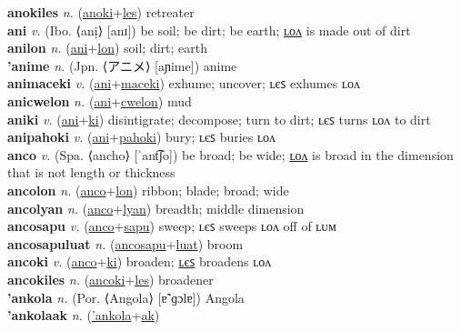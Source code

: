 \textbf{anokiles} \textit{n.} (\hyperref[anoki]{anoki}+\hyperref[les]{les})
retreater \label{anokiles} \\
\textbf{ani} \textit{v.} (Ibo. ⟨anị⟩ [anɪ])
be soil; be dirt; be earth; \hyperref[anilon]{ʟᴏᴧ} is made out of dirt \label{ani} \\
\textbf{anilon} \textit{n.} (\hyperref[ani]{ani}+\hyperref[lon]{lon})
soil; dirt; earth \label{anilon} \\
\textbf{'anime} \textit{n.} (Jpn. ⟨アニメ⟩ [aɲime])
anime \label{'anime} \\
\textbf{animaceki} \textit{v.} (\hyperref[ani]{ani}+\hyperref[maceki]{maceki})
exhume; uncover; ʟєꜱ exhumes ʟᴏᴧ \label{animaceki} \\
\textbf{anicwelon} \textit{n.} (\hyperref[ani]{ani}+\hyperref[cwelon]{cwelon})
mud \label{anicwelon} \\
\textbf{aniki} \textit{v.} (\hyperref[ani]{ani}+\hyperref[ki]{ki})
disintigrate; decompose; turn to dirt; ʟєꜱ turns ʟᴏᴧ to dirt \label{aniki} \\
\textbf{anipahoki} \textit{v.} (\hyperref[ani]{ani}+\hyperref[pahoki]{pahoki})
bury; ʟєꜱ buries ʟᴏᴧ \label{anipahoki} \\
\textbf{anco} \textit{v.} (Spa. ⟨ancho⟩ [ˈant͡ʃo])
be broad; be wide; \hyperref[ancolon]{ʟᴏᴧ} is broad in the dimension that is not length or thickness \label{anco} \\
\textbf{ancolon} \textit{n.} (\hyperref[anco]{anco}+\hyperref[lon]{lon})
ribbon; blade; broad; wide \label{ancolon} \\
\textbf{ancolyan} \textit{n.} (\hyperref[anco]{anco}+\hyperref[lyan]{lyan})
breadth; middle dimension \label{ancolyan} \\
\textbf{ancosapu} \textit{v.} (\hyperref[anco]{anco}+\hyperref[sapu]{sapu})
sweep; ʟєꜱ sweeps ʟᴏᴧ off of ʟᴜᴍ \label{ancosapu} \\
\textbf{ancosapuluat} \textit{n.} (\hyperref[ancosapu]{ancosapu}+\hyperref[luat]{luat})
broom \label{ancosapuluat} \\
\textbf{ancoki} \textit{v.} (\hyperref[anco]{anco}+\hyperref[ki]{ki})
broaden; \hyperref[ancokiles]{ʟєꜱ} broadens ʟᴏᴧ \label{ancoki} \\
\textbf{ancokiles} \textit{n.} (\hyperref[ancoki]{ancoki}+\hyperref[les]{les})
broadener \label{ancokiles} \\
\textbf{'ankola} \textit{n.} (Por. ⟨Angola⟩ [ɐ̃ˈɡɔlɐ])
Angola \label{'ankola} \\
\textbf{'ankolaak} \textit{n.} (\hyperref['ankola]{'ankola}+\hyperref[ak]{ak})
